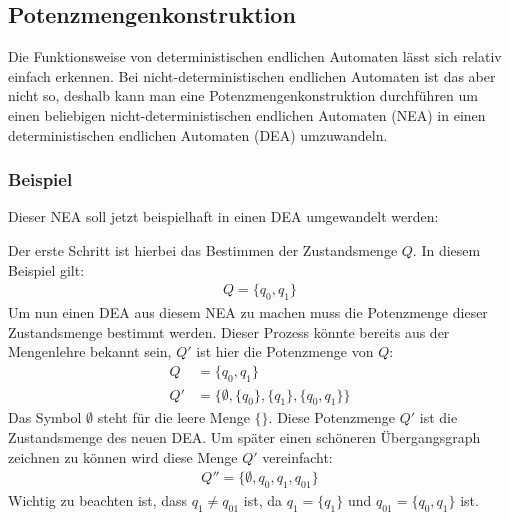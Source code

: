 \subsection{Potenzmengenkonstruktion}
\begin{flushleft}
    Die Funktionsweise von deterministischen endlichen Automaten lässt sich relativ einfach erkennen.
    Bei nicht-deterministischen endlichen Automaten ist das aber nicht so, deshalb kann man eine Potenzmengenkonstruktion 
    durchführen um einen beliebigen nicht-deterministischen endlichen Automaten (NEA) in einen deterministischen endlichen 
    Automaten (DEA) umzuwandeln.
    \subsubsection{Beispiel \cite{potenzmengenkonstruktion}}
    Dieser NEA soll jetzt beispielhaft in einen DEA umgewandelt werden:
    \begin{center}
    \end{center}
    Der erste Schritt ist hierbei das Bestimmen der Zustandsmenge $Q$. In diesem Beispiel gilt:
    \begin{align}
        Q=\{q_0,q_1\}
    \end{align}
    Um nun einen DEA aus diesem NEA zu machen muss die Potenzmenge dieser Zustandsmenge bestimmt werden.
    Dieser Prozess könnte bereits aus der Mengenlehre bekannt sein, $Q'$ ist hier die Potenzmenge von $Q$:
    \begin{align}
        Q &=\{q_0,q_1\} \\
        Q' &=\{\emptyset,\{q_0\},\{q_1\},\{q_0,q_1\}\}
    \end{align}
    Das Symbol $\emptyset$ steht für die leere Menge $\{\}$. Diese Potenzmenge $Q'$ ist die Zustandsmenge 
    des neuen DEA. Um später einen schöneren Übergangsgraph zeichnen zu können wird diese Menge $Q'$ vereinfacht:
    \begin{align}
        Q'' =\{\emptyset,q_0,q_1,q_{01}\}
    \end{align}
    Wichtig zu beachten ist, dass $q_1 \neq q_{01}$ ist, da $q_1=\{q_1\}$ und $q_{01}=\{q_0,q_1\}$ ist.

\end{flushleft}
